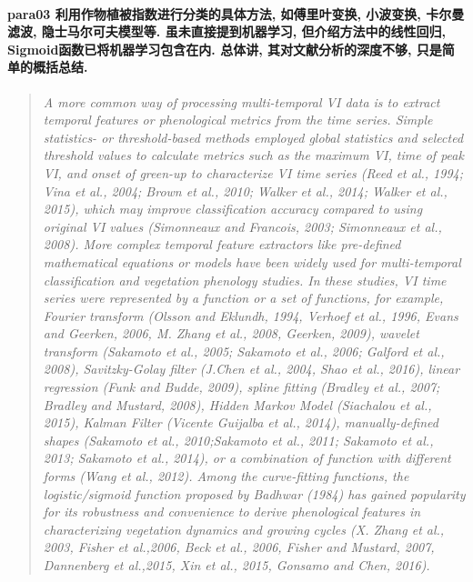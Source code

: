 \paragraph*{para03
    \textcolor[RGB]{17, 205, 29}{利用作物植被指数进行分类的具体方法, 如傅里叶变换, 小波变换, 卡尔曼滤波, 隐士马尔可夫模型等. 虽未直接提到机器学习, 但介绍方法中的线性回归, Sigmoid函数已将机器学习包含在内. 总体讲, 其对文献分析的深度不够, 只是简单的概括总结.}}
\begin{quotation}
    \itshape
    A more common way of processing multi-temporal VI data is to extract temporal features or phenological metrics from the time series. Simple statistics- or threshold-based methods employed global statistics and selected threshold values to calculate metrics such as the maximum VI, time of peak VI, and onset of green-up to characterize VI time series (Reed et al., 1994; Vina et al., 2004; Brown et al., 2010; Walker et al., 2014; Walker et al., 2015), which may improve classification accuracy compared to using original VI values (Simonneaux and Francois, 2003; Simonneaux et al., 2008). More complex temporal feature extractors like pre-defined mathematical equations or models have been widely used for multi-temporal classification and vegetation phenology studies. In these studies, VI time series were represented by a function or a set of functions, for example, Fourier transform (Olsson and Eklundh, 1994, Verhoef et al., 1996, Evans and Geerken, 2006, M. Zhang et al., 2008, Geerken, 2009), wavelet transform (Sakamoto et al., 2005; Sakamoto et al., 2006; Galford et al., 2008), Savitzky-Golay filter (J.Chen et al., 2004, Shao et al., 2016), linear regression (Funk and Budde, 2009), spline fitting (Bradley et al., 2007; Bradley and Mustard, 2008), Hidden Markov Model (Siachalou et al., 2015), Kalman Filter (Vicente Guijalba et al., 2014), manually-defined shapes (Sakamoto et al., 2010;Sakamoto et al., 2011; Sakamoto et al., 2013; Sakamoto et al., 2014), or a combination of function with different forms (Wang et al., 2012). Among the curve-fitting functions, the logistic/sigmoid function proposed by Badhwar (1984) has gained popularity for its robustness and convenience to derive phenological features in characterizing vegetation dynamics and growing cycles (X. Zhang et al., 2003, Fisher et al.,2006, Beck et al., 2006, Fisher and Mustard, 2007, Dannenberg et al.,2015, Xin et al., 2015, Gonsamo and Chen, 2016).
\end{quotation}

